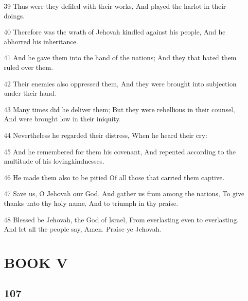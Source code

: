 \par 39 Thus were they defiled with their works, And played the harlot in their doings.
\par 40 Therefore was the wrath of Jehovah kindled against his people, And he abhorred his inheritance.
\par 41 And he gave them into the hand of the nations; And they that hated them ruled over them.
\par 42 Their enemies also oppressed them, And they were brought into subjection under their hand.
\par 43 Many times did he deliver them; But they were rebellious in their counsel, And were brought low in their iniquity.
\par 44 Nevertheless he regarded their distress, When he heard their cry:
\par 45 And he remembered for them his covenant, And repented according to the multitude of his lovingkindnesses.
\par 46 He made them also to be pitied Of all those that carried them captive.
\par 47 Save us, O Jehovah our God, And gather us from among the nations, To give thanks unto thy holy name, And to triumph in thy praise.
\par 48 Blessed be Jehovah, the God of Israel, From everlasting even to everlasting. And let all the people say, Amen. Praise ye Jehovah.

\part{BOOK V}

\chapter{107}

